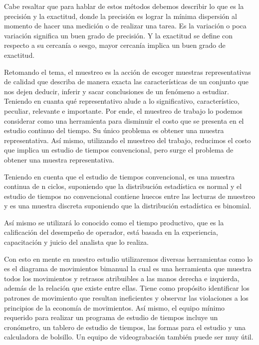     
    Cabe resaltar que para hablar de estos métodos debemos describir lo que es la precisión y la exactitud, donde la precisión es lograr la mínima dispersión al momento de hacer una medición o de realizar una tarea. Es la variación o poca variación significa un buen grado de precisión. Y la exactitud se define con respecto a su cercanía o sesgo, mayor cercanía implica un buen grado de exactitud.
    
    Retomando el tema, el muestreo es la acción de escoger muestras representativas de calidad que describa de manera exacta las características de un conjunto que nos dejen deducir, inferir y sacar conclusiones de un fenómeno a estudiar. \cite{RAE} Teniendo en cuanta qué representativo alude a lo significativo, característico, peculiar, relevante e importante. \cite{RAE}
    Por ende, el muestreo de trabajo lo podemos considerar como una herramienta para disminuir el costo que se presenta  en el estudio continuo del tiempo. Su único problema es obtener una muestra representativa. Así mismo, utilizando el muestreo del trabajo, reducimos el costo que implica un estudio de tiempos convencional, pero surge el problema de obtener una muestra representativa.
    
    Teniendo en cuenta que el estudio de tiempos convencional, es una muestra continua de n ciclos, suponiendo que la distribución estadística es normal y el estudio de tiempos no convencional contiene huecos entre las lecturas de muestreo y es una muestra discreta suponiendo que la distribución estadística es binomial.
    
    
    Así mismo se utilizará lo conocido como el tiempo productivo, que es la calificación del desempeño de operador, está basada en la experiencia, capacitación y juicio del analista que lo realiza.
    
    
    Con esto en mente en nuestro estudio utilizaremos diversas herramientas como lo es el diagrama de movimientos bimanual la cual es una herramienta que muestra todos los movimientos y retrasos atribuibles a las manos derecha e izquierda, además de la relación que existe entre ellas. Tiene como propósito identificar los patrones de movimiento que resultan ineficientes y observar las violaciones a los principios de la economía de movimientos.\cite{niebel1980ingenieria} Así mismo, el equipo mínimo requerido para realizar un programa de estudio de tiempos incluye un cronómetro, un tablero de estudio de tiempos, las formas para el estudio y una calculadora de bolsillo. Un equipo de videograbación también puede ser muy útil.
    
